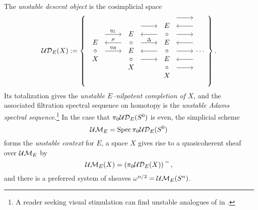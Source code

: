 \begin{definition}\label{UASSDefinition}
The \textit{unstable descent object} is the cosimplicial space
\[\sheaf{UD}_E(X) := \left\{
\begin{tikzcd}
\begin{array}{c} E \\ \circ \\ X \end{array} \arrow[leftarrow, shift left=\baselineskip]{r}{\mu} \arrow[shift left=(2*\baselineskip)]{r}{\eta_L} \arrow{r}{\eta_R} &
\begin{array}{c} E \\ \circ \\ E \\ \circ \\ X \end{array} \arrow[shift left=(3*\baselineskip)]{r} \arrow[leftarrow, shift left=(2*\baselineskip)]{r} \arrow[shift left=\baselineskip]{r}{\Delta} \arrow[leftarrow]{r} \arrow[shift right=\baselineskip]{r} &
\begin{array}{c} E \\ \circ \\ E \\ \circ \\ E \\ \circ \\ X \end{array} \arrow[shift left=(4*\baselineskip)]{r} \arrow[leftarrow, shift left=(3*\baselineskip)]{r} \arrow[shift left=(2*\baselineskip)]{r} \arrow[leftarrow, shift left=\baselineskip]{r} \arrow{r} \arrow[leftarrow, shift right=\baselineskip]{r} \arrow[shift right=(2*\baselineskip)]{r} &
\cdots
\end{tikzcd}
\right\}.\]
Its totalization gives the \textit{unstable \(E\)--nilpotent completion of \(X\)}, and the associated filtration spectral sequence on homotopy is the \textit{unstable Adams spectral sequence}.\footnote{A reader seeking visual stimulation can find unstable analogues of  in \cite{BPS}.}  In the case that \(\pi_0 \mathcal{UD}_E(S^0)\) is even, the simplicial scheme \[\mathcal{UM}_{E} = \operatorname{Spec} \pi_0 \mathcal{UD}_E(S^0)\] forms the \textit{unstable context} for \(E\), a space \(X\) gives rise to a quasicoherent sheaf over \(\mathcal{UM}_{E}\) by \[\mathcal{UM}_{E}(X) = (\pi_0 \mathcal{UD}_E(X))\widetilde{\quad},\] and there is a preferred system of sheaves \(\omega^{n/2} = \mathcal{UM}_{E}(S^n)\).
\end{definition}

